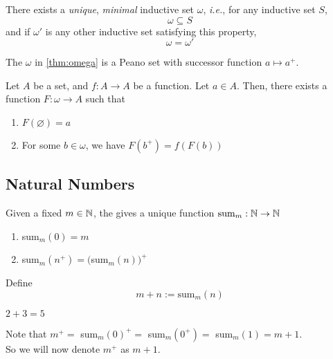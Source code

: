 \documentclass[12pt]{article}
\begin{document}
\begin{thm} \label{thm:omega}
    There exists a \emph{unique}, \emph{minimal} inductive set $\omega$, \textit{i.e.}, for any inductive set $S$, \[
        \omega \subseteq S
    \] and if $\omega'$ is any other inductive set satisfying this property, \[
        \omega = \omega'
    \]
\end{thm}

\begin{thm} \label{thm:omega peano}
    The $\omega$ in \cref{thm:omega} is a Peano set with successor function $a \mapsto a^{+}$.
\end{thm}

\begin{thm} \label{thm:recursion}
    Let $A$ be a set, and $f: A \to A$ be a function. Let $a \in A$. Then, there exists a function $F: \omega \to A$ such that
    \begin{enumerate}[label=(\alph*)]
        \item $F(\varnothing) = a$
        \item For some $b \in \omega$, we have $F(b^{+}) = f(F(b))$
    \end{enumerate}
\end{thm}

\subsection{Natural Numbers}

\begin{defn} \label{defn:addn}
    Given a fixed $m \in \mathbb{N}$, the  gives a unique function $\text{sum}_{m} : \mathbb{N} \to \mathbb{N}$
    \begin{enumerate}[label=(\alph*)]
        \item sum$_{m} (0) = m$ 
        \item sum$_{m} (n^{+}) = ($sum$_{m}(n))^{+}$
    \end{enumerate}
    Define \[
        m + n := \text{sum}_{m}(n)
    \]
\end{defn}

\begin{prop} \label{prop:2+3=5}
    $2 + 3 = 5$
\end{prop}

\begin{rem}
    Note that $m^{+} =$ sum$_{m}(0)^{+} = $ sum$_{m}(0^{+}) = $ sum$_{m}(1) = m + 1$. \\
    So we will now denote $m^{+}$ as $m + 1$.
\end{rem}
\end{document}
